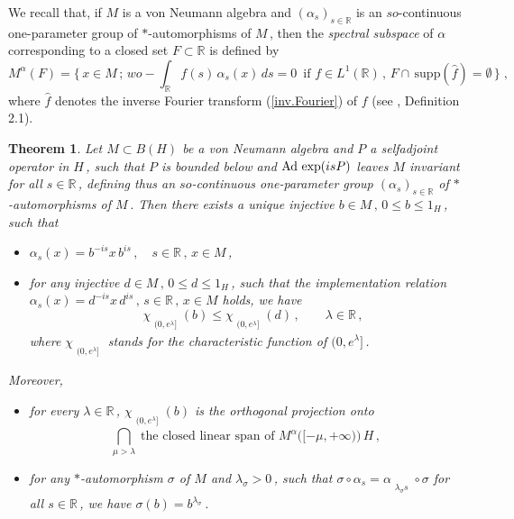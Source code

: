 \documentclass[reqno]{amsart}
\newtheorem{theorem}{Theorem}[section]
\theoremstyle{definition}
\theoremstyle{remark}
\numberwithin{equation}{section}
\theoremstyle{plain}
\begin{document}
We recall that, if $M$ is a von Neumann algebra and
$(\alpha_s )_{s\in\mathbb R}$ is an $so$-continuous one-parameter
group of $*$-automorphisms of $M\,$, then the \emph{spectral subspace}
of $\alpha$ corresponding to a closed set $F\subset\mathbb R$
is defined by
\begin{equation*}
M^\alpha (F) =\Big\{\, x\in M\, ;\, wo-\int_{\mathbb R} f(s)\,
\alpha_s(x)\, ds =0\,\text{ if }f\in L^1(\mathbb R )\, ,\, F\cap\,
\text{supp} (\hat{f}) =\emptyset\,\Big\}\; ,
\end{equation*}
where $\hat{f}$ denotes the inverse Fourier transform
(\ref{inv.Fourier}) of $f$ (see \cite{Arv}, Definition 2.1).
\smallskip

\begin{theorem}\label{pos.gen}
Let $M\subset B(H)$ be a von Neumann algebra and $P$ a selfadjoint
operator in $H\,$, such that $P$ is bounded below and
$\text{\rm Ad}\,\exp (isP)$ leaves $M$ invariant for all
$s\in\mathbb R\,$, defining thus an $so$-continuous one-parameter
group $(\alpha_s )_{s\in\mathbb R}$ of $*$-automorphisms of $M\,$.
Then there exists a unique injective $b\in M\, ,\, 0\leq b\leq 1_H\,$,
such that
\begin{itemize}
\item[(i)] $\alpha_s (x)=b^{-i s} x\, b^{i s}\, ,\quad
s\in\mathbb R\, ,\, x\in M\,$,
\item[(ii)] for any injective $d\in M\, ,\, 0\leq d\leq 1_H\,$,
such that the implementation relation $\alpha_s (x)=d^{-i s} x\,
d^{i s}\, ,\, s\in\mathbb R\, ,\, x\in M$ holds, we have
\begin{equation*} \phantom{xx}
\chi_{\substack{{}\\{(0,e^\lambda ]}}}(b) \leq
\chi_{\substack{{}\\{(0,e^\lambda ]}}}(d)\, ,\qquad
\lambda\in\mathbb R\, ,
\end{equation*}
where $\chi_{\substack{{}\\{(0,e^\lambda ]}}}$ stands for the
characteristic function of $(0,e^\lambda ]\,$.
\end{itemize}
Moreover,
\begin{itemize}
\item[(iii)] for every $\lambda\in\mathbb R\,$,
$\chi_{\substack{{}\\{(0,e^\lambda ]}}}(b)$ is the orthogonal
projection onto
\begin{equation*}
\bigcap_{\mu >\lambda}\;\text{the closed linear span of }
M^\alpha\big( [-\mu ,+\infty )\big)\, H\, ,
\end{equation*}
\item[(iv)] for any $*$-automorphism $\sigma$ of $M$ and
$\lambda_\sigma >0\,$, such that $\sigma\circ\alpha_s =
\alpha_{\substack{{}\\ {\lambda_\sigma s}}}\circ\sigma$ for all
$s\in\mathbb R\,$, we have $\sigma (b) =b^{\lambda_\sigma}\,$.
\end{itemize}
\end{theorem}
\smallskip
\end{document}
